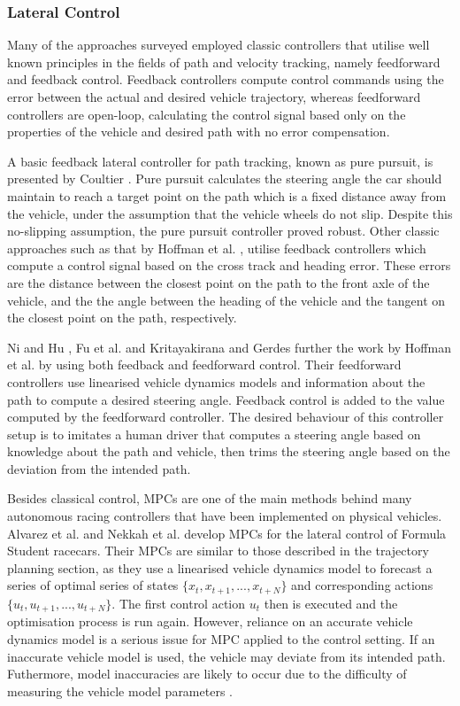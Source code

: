\subsubsection*{Lateral Control}

Many of the approaches surveyed employed classic controllers that utilise well known principles in the fields of path and velocity tracking, namely feedforward and feedback control.
Feedback controllers compute control commands using the error between the actual and desired vehicle trajectory, whereas feedforward controllers are open-loop, calculating the control signal based only on the properties of the vehicle and desired path with no error compensation.

A basic feedback lateral controller for path tracking, known as pure pursuit, is presented by Coultier \cite{Coulter_1992}. 
Pure pursuit calculates the steering angle the car should maintain to reach a target point on the path which is a fixed distance away from the vehicle, under the assumption that the vehicle wheels do not slip. 
Despite this no-slipping assumption, the pure pursuit controller proved robust.
Other classic approaches such as that by Hoffman et al. \cite{Hoffmann2007}, utilise feedback controllers which compute a control signal based on the cross track and heading error.
These errors are the distance between the closest point on the path to the front axle of the vehicle, and the the angle between the heading of the vehicle and the tangent on the closest point on the path, respectively.

Ni and Hu \cite{Ni2017}, Fu et al. \cite{Fu2016} and Kritayakirana and Gerdes \cite{Kritayakirana2012} further the work by Hoffman et al. \cite{Hoffmann2007} by using both feedback and feedforward control. 
Their feedforward controllers use linearised vehicle dynamics models and information about the path to compute a desired steering angle. Feedback control is added to the value computed by the feedforward controller.
The desired behaviour of this controller setup is to imitates a human driver that computes a steering angle based on knowledge about the path and vehicle, then trims the steering angle based on the deviation from the intended path.

Besides classical control, MPCs are one of the main methods behind many autonomous racing controllers that have been implemented on physical vehicles.
Alvarez et al. \cite{alvarez2022} and Nekkah et al. \cite{Nekkah2020} develop MPCs for the lateral control of Formula Student racecars.
Their MPCs  are similar to those described in the trajectory planning section, as they use a linearised vehicle dynamics model to forecast a series of optimal series of states $\{ x_t, x_{t+1}, ..., x_{t+N}\}$ and corresponding actions $\{ u_t, u_{t+1}, ..., u_{t+N}\}$. 
The first control action $u_{t}$ then is executed and the optimisation process is run again.
However, reliance on an accurate vehicle dynamics model is a serious issue for MPC applied to the control setting. 
If an inaccurate vehicle model is used, the vehicle may deviate from its intended path.
Futhermore, model inaccuracies are likely to occur due to the difficulty of measuring the vehicle model parameters \cite{Kabzan2019, Pan2017}.

